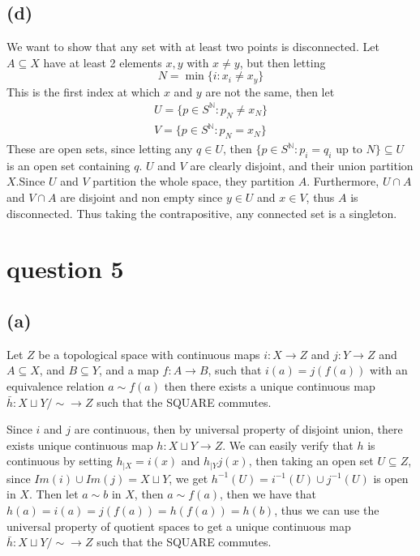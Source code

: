 \documentclass[a4paper,11pt]{article}
\begin{document}
\subsection{(d)}
We want to show that any set with at least two points is disconnected. Let $A \subseteq X$ have at least 2 elements $x,y$ with $x \neq y$, but then letting 
\begin{equation}
	N = \min \{ i \colon x_i \neq x_y\}
\end{equation}
This is the first index at which $x$ and $y$ are not the same, then let
\begin{align}
	U = \{p \in S^\mathbb{N} \colon p_N \neq x_N\}\\
	V = \{p \in S^\mathbb{N} \colon p_N = x_N\}
\end{align}
These are open sets, since letting any $q \in U$, then $\{ p \in S^{\mathbb{N}} \colon p_i = q_i \text{ up to $N$} \} \subseteq U$ is an open set containing $q$. $U$ and $V$ are clearly disjoint, and their union partition $X$.Since $U$ and $V$ partition the whole space, they partition $A$. Furthermore, $U \cap A$ and $V \cap A$ are disjoint and non empty since $y \in U$ and $x \in V$, thus $A$ is disconnected. Thus taking the contrapositive, any connected set is a singleton. 
	
\clearpage

\section{question 5}

\subsection{(a)}
Let $Z$ be a topological space with continuous maps $i \colon X \to Z$ and $j \colon Y \to Z$ and $A \subseteq X$, and $B \subseteq Y$, and a map $f \colon A \to B$, such that $i(a) = j(f(a))$ with an equivalence relation $a \sim f(a)$ then there exists a unique continuous map $\bar{h} \colon X \sqcup Y/\sim \to Z$ such that the SQUARE commutes. 

	Since $i$ and $j$ are continuous, then by universal property of disjoint union, there exists unique continuous map $h \colon X \sqcup Y \to Z$. We can easily verify that $h$ is continuous by setting $h_{|X} = i(x)$ and $h_{|Y} j(x)$, then taking an open set $U \subseteq Z$, since $Im(i) \cup Im(j) = X \sqcup Y$,  we get $h^{-1}(U) = i^{-1}(U) \cup j^{-1}(U)$ is open in $X$. Then let $a \sim b$ in $X$, then $a \sim f(a)$, then we have that $h(a) = i(a) = j(f(a)) = h(f(a)) = h(b)$, thus we can use the universal property of quotient spaces to get a unique continuous map $\bar{h} \colon X \sqcup Y /\sim \to Z$ such that the SQUARE commutes. 
\end{document}
